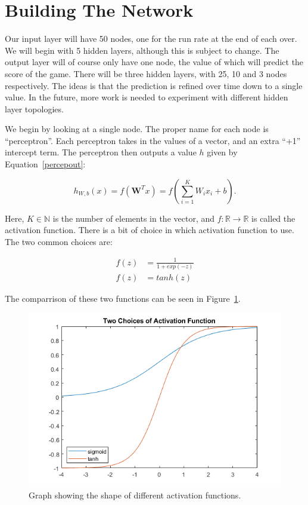 \section{Building The Network}
Our input layer will have 50 nodes, one for the run rate at the end of each over. We will begin with 5 hidden layers, although this is subject to change. The output layer
will of course only have one node, the value of which will predict the score of the game. There will be three hidden layers, with 25, 10 and 3 nodes respectively. 
The ideas is that the prediction is refined over time down to a single value. In the future, more work is needed to experiment with different hidden layer topologies. 

We begin by looking at a single node. The proper name for each node is ``perceptron''. Each perceptron takes in the values of a vector, and an extra ``+1'' intercept term. The perceptron then outputs a value $h$ given by Equation~\ref{percepout}:

\begin{equation}
    \label{percepout}
    h_{W,b}(x) = f(\textbf{W}^Tx) = f(\sum_{i=1}^KW_ix_i+b).
\end{equation}

Here, $K \in \mathbb{N}$ is the number of elements in the vector, and $f:\mathbb{R} \rightarrow \mathbb{R}$ is called the activation function. There is a bit of choice in which activation function to use.
The two common choices are:

\begin{align}
    \label{sigmoid_func}
    f(z) &= \frac{1}{1+exp(-z)} \\
    f(z) &= tanh(z)
\end{align}

The comparrison of these two functions can be seen in Figure~\ref{actfig}.

\begin{figure}[h]
    \centering
    \includegraphics[scale=0.5]{figures/actfuncs.png}
    \caption{Graph showing the shape of different activation functions.}
    \label{actfig}
\end{figure}

